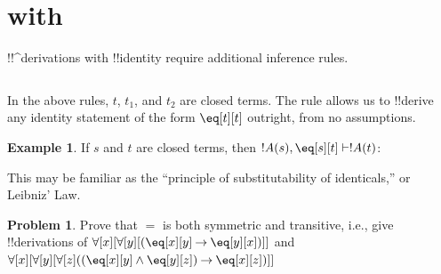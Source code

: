 \documentclass[10pt,a4paper]{article}
\theoremstyle{plain}
\theoremstyle{definition}
\newtheorem{ex}[thm]{Example}
\newtheorem{prob}{Problem}[section]
\theoremstyle{remark}
\newcommand*{\olfileid}[3]{}
\newcommand*{\olsection}[1]{\section*{#1}}
\providecommand{\AxiomC}[1]{}
\providecommand{\UnaryInfC}[1]{}
\providecommand{\BinaryInfC}[1]{}
\providecommand{\RightLabel}[1]{}
\providecommand{\DisplayProof}{}
\newenvironment{prooftree}{}{}
\providecommand{\lif}{\mathbin{\rightarrow}}
\providecommand{\lforall}{\mathord{\forall}}
\providecommand{\Proves}{\mathrel{\vdash}}
\providecommand{\Elim}[1]{}
\providecommand{\Intro}[1]{}
\providecommand{\Intro}{\mathrm{I}}
\begin{document}



\olfileid{fol}{ntd}{ide}

\olsection{ with }

!!^{derivation}s with !!{identity} require additional inference rules.

\begin{defish}
\AxiomC{}
\RightLabel{\Intro{\eq}}
\UnaryInfC{$\eq[t][t]$}
\DisplayProof
\hfill
\begin{tabular}{r}
\AxiomC{$\eq[t_1][t_2]$}
\AxiomC{$!A(t_1)$}
\RightLabel{\Elim{\eq}}
\BinaryInfC{$!A(t_2)$}
\DisplayProof
\\[3ex]
\AxiomC{$\eq[t_1][t_2]$}
\AxiomC{$!A(t_2)$}
\RightLabel{\Elim{\eq}}
\BinaryInfC{$!A(t_1)$}
\DisplayProof
\end{tabular}
\end{defish}

In the above rules, $t$, $t_1$, and $t_2$ are closed terms. The
\Intro{\eq} rule allows us to !!{derive} any identity statement of the
form $\eq[t][t]$ outright, from no assumptions.

\begin{ex}
If $s$ and $t$ are closed terms, then $!A(s), \eq[s][t] \Proves !A(t)$:
\begin{prooftree}
\AxiomC{$\eq[s][t]$}
\AxiomC{$!A(s)$}
\RightLabel{$\Elim{\eq}$}
\BinaryInfC{$!A(t)$}
\end{prooftree}
This may be familiar as the ``principle of substitutability of
identicals,'' or Leibniz' Law.
\end{ex}

\begin{prob}
Prove that $=$ is both symmetric and transitive, i.e., give
!!{derivation}s of $\lforall[x][\lforall[y][(\eq[x][y] \lif
    \eq[y][x])]]$ and $\lforall[x][\lforall[y][\lforall[z]((\eq[x][y]
    \land \eq[y][z]) \lif \eq[x][z])]]$
\end{prob}
\end{document}
